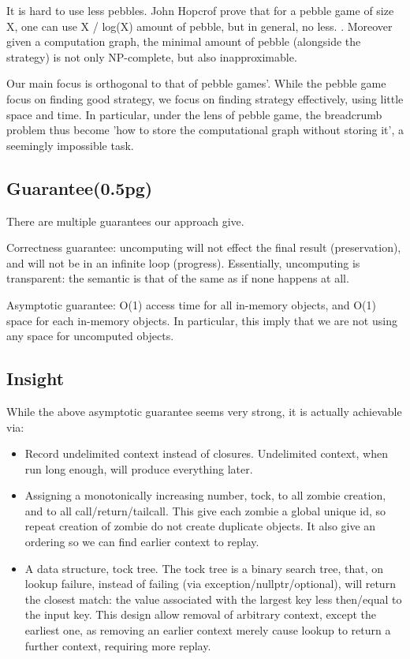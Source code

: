 It is hard to use less pebbles. John Hopcrof prove that for a pebble game of size X, one can use X / log(X) amount of pebble, but in general, no less. . Moreover given a computation graph, the minimal amount of pebble (alongside the strategy) is not only NP-complete, but also inapproximable.


Our main focus is orthogonal to that of pebble games'. While the pebble game focus on finding good strategy, we focus on finding strategy effectively, using little space and time. In particular, under the lens of pebble game, the breadcrumb problem thus become 'how to store the computational graph without storing it', a seemingly impossible task.
\subsection{Guarantee(0.5pg)}
There are multiple guarantees our approach give.

Correctness guarantee: uncomputing will not effect the final result (preservation), and will not be in an infinite loop (progress). Essentially, uncomputing is transparent: the semantic is that of the same as if none happens at all.

Asymptotic guarantee: O(1) access time for all in-memory objects, and O(1) space for each in-memory objects. In particular, this imply that we are not using any space for uncomputed objects.

\subsection{Insight}
While the above asymptotic guarantee seems very strong, it is actually achievable via:

\begin{itemize}
	\item Record undelimited context instead of closures. Undelimited context, when run long enough, will produce everything later.
	\item Assigning a monotonically increasing number, tock, to all zombie creation, and to all call/return/tailcall. This give each zombie a global unique id, so repeat creation of zombie do not create duplicate objects. It also give an ordering so we can find earlier context to replay.
	\item A data structure, tock tree. The tock tree is a binary search tree, that, on lookup failure, instead of failing (via exception/nullptr/optional), will return the closest match: the value associated with the largest key less then/equal to the input key. This design allow removal of arbitrary context, except the earliest one, as removing an earlier context merely cause lookup to return a further context, requiring more replay.
\end{itemize}

